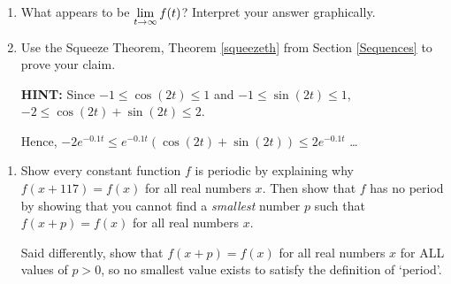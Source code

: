 \documentclass{ximera}
\begin{document}
\begin{enumerate}
\begin{enumerate}

\item What appears to be $\ds{\lim_{t \rightarrow \infty} f(t)}$?   Interpret your answer graphically.

\smallskip

\item  Use the Squeeze Theorem, Theorem \ref{squeezeth} from Section \ref{Sequences} to prove your claim.  

\smallskip

\textbf{HINT:}  Since $-1 \leq \cos(2t) \leq 1$ and $-1 \leq \sin(2t) \leq 1$, $-2 \leq \cos(2t) + \sin(2t) \leq 2$.  

\smallskip

Hence, $-2 e^{-0.1t} \leq e^{-0.1t} \left( \cos(2t) + \sin(2t)\right) \leq 2e^{-0.1t}$ \ldots

\end{enumerate}

\smallskip


\setcounter{HW}{\value{enumi}}

\end{enumerate}

\begin{enumerate}

\setcounter{enumi}{\value{HW}}

\item Show every constant function $f$ is periodic by explaining why $f(x + 117) = f(x)$ for all real numbers $x$. Then show that $f$ has no period by showing that you cannot find a \emph{smallest} number $p$ such that $f(x + p) = f(x)$ for all real numbers $x$.  

\smallskip

Said differently, show that $f(x + p) = f(x)$ for all real numbers $x$ for ALL values of $p > 0$, so no smallest value exists to satisfy the definition of `period'.

\setcounter{HW}{\value{enumi}}

\end{enumerate}
\end{document}
